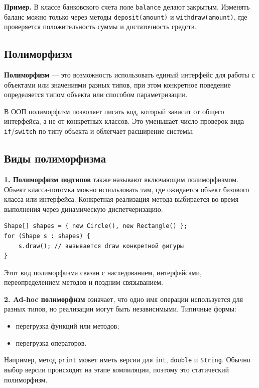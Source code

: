\textbf{Пример.} В классе банковского счета поле \texttt{balance} делают закрытым. Изменять баланс можно только через методы \texttt{deposit(amount)} и \texttt{withdraw(amount)}, где проверяется положительность суммы и достаточность средств.

\subsection*{Полиморфизм}

\textbf{Полиморфизм} --- это возможность использовать единый интерфейс для работы с объектами или значениями разных типов, при этом конкретное поведение определяется типом объекта или способом параметризации.

В ООП полиморфизм позволяет писать код, который зависит от общего интерфейса, а не от конкретных классов. Это уменьшает число проверок вида \texttt{if}/\texttt{switch} по типу объекта и облегчает расширение системы.

\subsection*{Виды полиморфизма}

\textbf{1. Полиморфизм подтипов} также называют включающим полиморфизмом. Объект класса-потомка можно использовать там, где ожидается объект базового класса или интерфейса. Конкретная реализация метода выбирается во время выполнения через динамическую диспетчеризацию.

\begin{verbatim}
Shape[] shapes = { new Circle(), new Rectangle() };
for (Shape s : shapes) {
    s.draw(); // вызывается draw конкретной фигуры
}
\end{verbatim}

Этот вид полиморфизма связан с наследованием, интерфейсами, переопределением методов и поздним связыванием.

\textbf{2. Ad-hoc полиморфизм} означает, что одно имя операции используется для разных типов, но реализации могут быть независимыми. Типичные формы:
\begin{itemize}
    \item перегрузка функций или методов;
    \item перегрузка операторов.
\end{itemize}

Например, метод \texttt{print} может иметь версии для \texttt{int}, \texttt{double} и \texttt{String}. Обычно выбор версии происходит на этапе компиляции, поэтому это статический полиморфизм.

